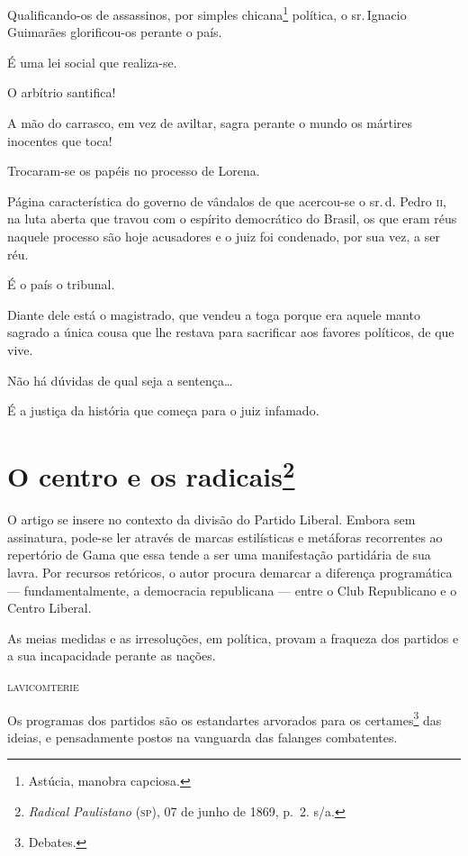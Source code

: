 Qualificando-os de assassinos, por simples chicana\footnote{Astúcia,
  manobra capciosa.} política, o sr.\,Ignacio Guimarães glorificou-os
perante o país.

É uma lei social que realiza-se.

O arbítrio santifica!

A mão do carrasco, em vez de aviltar, sagra perante o mundo os mártires
inocentes que toca!

Trocaram-se os papéis no processo de Lorena.

Página característica do governo de vândalos de que acercou-se o sr.\,d.
Pedro \textsc{ii}, na luta aberta que travou com o espírito democrático do
Brasil, os que eram réus naquele processo são hoje acusadores e o juiz
foi condenado, por sua vez, a ser réu.

É o país o tribunal.

Diante dele está o magistrado, que vendeu a toga porque era aquele manto
sagrado a única cousa que lhe restava para sacrificar aos favores
políticos, de que vive.

Não há dúvidas de qual seja a sentença\ldots{}

É a justiça da história que começa para o juiz infamado.

\chapter{O centro e os radicais\footnote{\emph{Radical Paulistano}
  (\textsc{sp}), 07 de junho de 1869, p.~2. s/a.}}

\begin{didascalia}
O artigo se insere no contexto da divisão do Partido Liberal. Embora sem
assinatura, pode-se ler através de marcas estilísticas e metáforas
recorrentes ao repertório de Gama que essa tende a ser uma manifestação
partidária de sua lavra. Por recursos retóricos, o autor procura
demarcar a diferença programática --- fundamentalmente, a democracia
republicana --- entre o Club Republicano e o Centro Liberal.
\end{didascalia}



\epigraph{As meias medidas e as irresoluções, em política, provam a fraqueza dos
partidos e a sua incapacidade perante as nações.}{\textsc{lavicomterie}\footnotemark}


Os programas dos partidos são os estandartes arvorados para os
certames\footnote{Debates.} das ideias, e pensadamente postos na
vanguarda das falanges combatentes.


